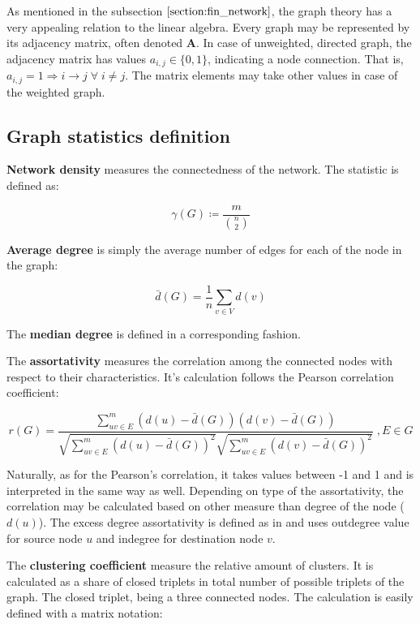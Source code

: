 \documentclass[12pt]{article}
\begin{document}
As mentioned in the subsection $\ref{section:fin_network}$, the graph theory has a very appealing relation to the linear algebra. Every graph may be represented by its adjacency matrix, often denoted $\mathbf{A}$. In case of unweighted, directed graph, the adjacency matrix has values $a_{i,j} \in \{0,1\}$, indicating a node connection. That is, $a_{i,j} = 1 \Rightarrow i \rightarrow j \; \forall \;  i \neq j$. The matrix elements may take other values in case of the weighted graph. 

\subsection{Graph statistics definition}

\textbf{Network density} measures the connectedness of the network. The statistic is defined as:

\begin{equation}
	\gamma(G) \coloneqq \frac{m}{{n \choose 2}}
\end{equation}

\textbf{Average degree} is simply the average number of edges for each of the node in the graph:

\begin{equation}
	\bar{d}(G) = \frac{1}{n} \sum_{v \in V} d(v)
\end{equation}

The \textbf{median degree} is defined in a corresponding fashion.

The \textbf{assortativity} measures the correlation among the connected nodes with respect to their characteristics. It's calculation follows the Pearson correlation coefficient:

\begin{equation}
	r(G) = \frac{\sum_{uv \in E}^{m} (d(u) - \bar{d}(G)) (d(v) - \bar{d}(G))}{\sqrt{\sum_{uv \in E}^{m} (d(u) - \bar{d}(G))^2} \sqrt{\sum_{uv \in E}^{m} (d(v) - \bar{d}(G))^2}} \;, E \in G
\end{equation}

Naturally, as for the Pearson's correlation, it takes values between -1 and 1 and is interpreted in the same way as well. Depending on type of the assortativity, the correlation may be calculated based on other measure than degree of the node ($d(u)$). The excess degree assortativity is defined as in \cite{newman02} and uses outdegree value for source node $u$ and indegree for destination node $v$.

The \textbf{clustering coefficient} measure the relative amount of clusters. It is calculated as a share of closed triplets in total number of possible triplets of the graph. The closed triplet, being a three connected nodes. The calculation is easily defined with a matrix notation:
\end{document}
